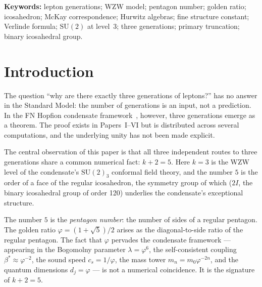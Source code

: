 \documentclass[11pt,a4paper]{article}
\theoremstyle{definition}
\theoremstyle{remark}
\newcommand{\vp}{\varphi}
\newcommand{\lam}{\lambda}
\newcommand{\bst}{\beta^{*}}
\newcommand{\twoI}{2I}
\newcommand{\Ehat}{\hat{E}_8}
\begin{document}
\begin{abstract}
The Pentagon Theorem is specific to \emph{lepton} generations.
For \emph{quark} generations, Paper~VI~\cite{Paper6}
(Remark~\textup{5.6} therein) establishes that the
quark sector is governed by $E_8$ Coxeter exponent saturation --- a
structurally different mechanism within the same $\twoI/\Ehat$ structure,
proved in Paper~V~\cite{Paper5}.
The question of whether the Pentagon Theorem applies to quarks via a
different WZW embedding is therefore answered negatively: it does not.
\end{abstract}

\footnotesize
\footnotesize
\noindent\textbf{Keywords:} lepton generations; WZW model; pentagon number;
golden ratio; icosahedron; McKay correspondence; Hurwitz algebras;
fine structure constant; Verlinde formula; $\mathrm{SU}(2)$ at level~3;
three generations; primary truncation; binary icosahedral group.
\normalsize
\normalsize

\tableofcontents

\newpage

\section{Introduction}
\label{F:sec:intro}

The question ``why are there exactly three generations of leptons?'' has
no answer in the Standard Model: the number of generations is an input,
not a prediction.
In the FN Hopfion condensate framework~\cite{Paper1,Paper6}, however,
three generations emerge as a theorem.
The proof exists in Papers~I--VI but is distributed across several
computations, and the underlying unity has not been made explicit.

The central observation of this paper is that all three independent routes
to three generations share a common numerical fact: $k+2=5$.
Here $k=3$ is the WZW level of the condensate's $\mathrm{SU}(2)_3$
conformal field theory, and the number $5$ is the order of a face of the
regular icosahedron, the symmetry group of which ($2I$, the binary
icosahedral group of order 120) underlies the condensate's exceptional
structure.

The number $5$ is the \emph{pentagon number}: the number of sides of a
regular pentagon.
The golden ratio $\vp = (1+\sqrt{5})/2$ arises as the diagonal-to-side
ratio of the regular pentagon.
The fact that $\vp$ pervades the condensate framework --- appearing in the
Bogomolny parameter $\lam=\vp^6$, the self-consistent coupling
$\bst\approx\vp^{-2}$, the sound speed $c_s=1/\vp$, the mass tower
$m_n = m_0\vp^{-2n}$, and the quantum dimensions $d_j=\vp$ --- is not a
numerical coincidence.
It is the signature of $k+2=5$.
\end{document}
